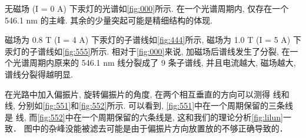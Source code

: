 \documentclass[font=default]{mpltx}
\begin{document}
  无磁场 (I = 0 A) 下汞灯的光谱如\autoref{fig:000}所示. 在一个光谱周期内, 仅存在一个 546.1 nm 的主峰. 其余的少量突起可能是精细结构的体现.
  \par
  磁场为 0.8 T (I = 4 A) 下汞灯的子谱线如\autoref{fig:444}所示, 磁场为 1.0 T (I = 5 A) 下汞灯的子谱线如\autoref{fig:555}所示. 
  相对于\autoref{fig:000}来说, 加磁场后谱线发生了分裂, 在一个光谱周期内原来的 546.1 nm 线分裂成了 9 条子谱线, 
  并且电流越大, 磁场越大, 谱线分裂得越明显. 

  在光路中加入偏振片, 旋转偏振片的角度, 在两个相互垂直的方向可以测得 \pi 线和 \sigma 线, 分别如\autoref{fig:551}和\autoref{fig:552}所示.
  可以看到, \autoref{fig:551}中在一个周期保留的三条线是 \pi 线, 
  而\autoref{fig:552}中在一个周期保留的六条线是, 这和我们的理论分析\autoref{fig:lilun}一致．
  图中的杂峰没能被滤去可能是由于偏振片方向放置放的不够正确导致的．
\end{document}
